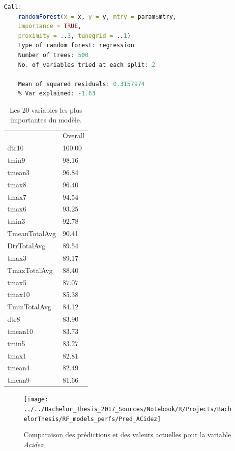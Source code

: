 \begin{minipage}{\linewidth}
	
	\begin{lstlisting}[showstringspaces=false,language=R, caption={Test du modèle de classification},captionpos=b]
	Call:
	randomForest(x = x, y = y, mtry = param$mtry, 
	importance = TRUE,      
	proximity = ..3, tunegrid = ..1) 
	Type of random forest: regression
	Number of trees: 500
	No. of variables tried at each split: 2
	
	Mean of squared residuals: 0.3157974
	% Var explained: -1.63
	\end{lstlisting}
\end{minipage}


\begin{table}[H]
	\centering
	\caption{Les 20 variables les plus importantes du modèle.}
	\label{RF_Acidez_Varimp}
	\begin{tabular}{ll}
	 & Overall \\
	 dtr10         & 100.00  \\
	 tmin9         & 98.16   \\
	 tmean3        & 96.84   \\
	 tmax8         & 96.40   \\
	 tmax7         & 94.54   \\
	 tmax6         & 93.25   \\
	 tmin3         & 92.78   \\
	 TmeanTotalAvg & 90.41   \\
	 DtrTotalAvg   & 89.54   \\
	 tmax3         & 89.17   \\
	 TmaxTotalAvg  & 88.40   \\
	 tmax5         & 87.07   \\
	 tmax10        & 85.38   \\
	 TminTotalAvg  & 84.12   \\
	 dtr8          & 83.90   \\
	 tmean10       & 83.73   \\
	 tmin5         & 83.27   \\
	 tmax1         & 82.81   \\
	 tmean4        & 82.49   \\
	 tmean9        & 81.66  
	\end{tabular}
\end{table}

\begin{figure}[H]
	\centering
	\texttt{[image: ../../Bachelor\_Thesis\_2017\_Sources/Notebook/R/Projects/BachelorThesis/RF\_models\_perfs/Pred\_ACidez]}
	\caption{Comparaison des prédictions et des valeurs actuelles pour la variable \textit{Acidez}}
	\label{fig:predacidez}
\end{figure}


